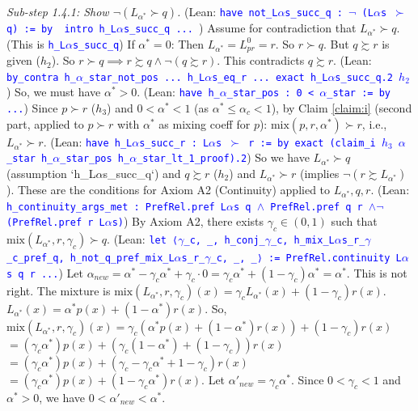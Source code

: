 \documentclass{article}
\theoremstyle{definition}
\newcommand{\tactic}[1]{\textcolor{blue}{\texttt{#1}}}
\newcommand{\pref}{\succsim} %
\newcommand{\strictpref}{\succ} %
\newcommand{\mix}{\mathrm{mix}} %
\begin{document}
    \textit{Sub-step 1.4.1: Show $\lnot (L_{\alpha^*} \strictpref q)$.}
    (Lean: \tactic{have not\_L$\alpha$s\_succ\_q : $\lnot$ (L$\alpha$s $\succ$ q) := by { intro h\_L$\alpha$s\_succ\_q ... }})
    Assume for contradiction that $L_{\alpha^*} \strictpref q$. (This is \tactic{h\_L$\alpha$s\_succ\_q})
    If $\alpha^* = 0$: Then $L_{\alpha^*} = L_{pr}^0 = r$. So $r \strictpref q$.
    But $q \pref r$ is given ($h_2$). So $r \strictpref q \implies r \pref q \land \lnot(q \pref r)$. This contradicts $q \pref r$.
    (Lean: \tactic{by\_contra h\_$\alpha$\_star\_not\_pos ... h\_L$\alpha$s\_eq\_r ... exact h\_L$\alpha$s\_succ\_q.2 $h_2$})
    So, we must have $\alpha^* > 0$. (Lean: \tactic{have h\_$\alpha$\_star\_pos : 0 < $\alpha$\_star := by ...})
    Since $p \strictpref r$ ($h_3$) and $0 < \alpha^* < 1$ (as $\alpha^* \le \alpha_c < 1$), by Claim \ref{claim:i} (second part, applied to $p \strictpref r$ with $\alpha^*$ as mixing coeff for $p$): $\mix(p,r,\alpha^*) \strictpref r$, i.e., $L_{\alpha^*} \strictpref r$.
    (Lean: \tactic{have h\_L$\alpha$s\_succ\_r : L$\alpha$s $\succ$ r := by exact (claim\_i $h_3$ $\alpha$\_star h\_$\alpha$\_star\_pos h\_$\alpha$\_star\_lt\_1\_proof).2})
    So we have $L_{\alpha^*} \strictpref q$ (assumption `h\_L$\alpha$s\_succ\_q`) and $q \pref r$ ($h_2$) and $L_{\alpha^*} \strictpref r$ (implies $\lnot(r \pref L_{\alpha^*})$).
    These are the conditions for Axiom A2 (Continuity) applied to $L_{\alpha^*}, q, r$.
    (Lean: \tactic{h\_continuity\_args\_met : PrefRel.pref L$\alpha$s q $\wedge$ PrefRel.pref q r $\wedge\lnot$(PrefRel.pref r L$\alpha$s)})
    By Axiom A2, there exists $\gamma_c \in (0,1)$ such that $\mix(L_{\alpha^*}, r, \gamma_c) \strictpref q$.
    (Lean: \tactic{let ⟨$\gamma$\_c, \_, h\_conj\_$\gamma$\_c, h\_mix\_L$\alpha$s\_r\_$\gamma$\_c\_pref\_q, h\_not\_q\_pref\_mix\_L$\alpha$s\_r\_$\gamma$\_c, \_, \_⟩ := PrefRel.continuity L$\alpha$s q r ...})
    Let $\alpha_{new} = \alpha^* - \gamma_c \alpha^* + \gamma_c \cdot 0 = \gamma_c \alpha^* + (1-\gamma_c)\alpha^* = \alpha^*$. This is not right.
    The mixture is $\mix(L_{\alpha^*}, r, \gamma_c)(x) = \gamma_c L_{\alpha^*}(x) + (1-\gamma_c)r(x)$.
    $L_{\alpha^*}(x) = \alpha^* p(x) + (1-\alpha^*) r(x)$.
    So, $\mix(L_{\alpha^*}, r, \gamma_c)(x) = \gamma_c (\alpha^* p(x) + (1-\alpha^*) r(x)) + (1-\gamma_c)r(x)$
    $= (\gamma_c \alpha^*) p(x) + (\gamma_c(1-\alpha^*) + (1-\gamma_c))r(x)$
    $= (\gamma_c \alpha^*) p(x) + (\gamma_c - \gamma_c\alpha^* + 1 - \gamma_c)r(x)$
    $= (\gamma_c \alpha^*) p(x) + (1 - \gamma_c\alpha^*)r(x)$.
    Let $\alpha'_{new} = \gamma_c \alpha^*$. Since $0 < \gamma_c < 1$ and $\alpha^* > 0$, we have $0 < \alpha'_{new} < \alpha^*$.
\end{document}
